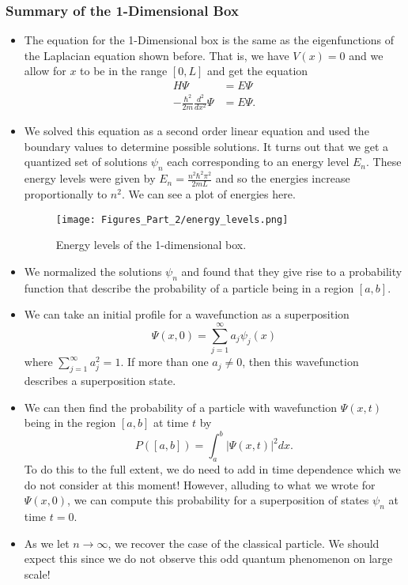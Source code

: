 \subsubsection{Summary of the 1-Dimensional Box}
\begin{itemize}
    \item The equation for the 1-Dimensional box is the same as the eigenfunctions of the Laplacian equation shown before. That is, we have $V(x)=0$ and we allow for $x$ to be in the range $[0,L]$ and get the equation
    \begin{align*}
        H\Psi &= E \Psi\\
        -\frac{\hbar^2}{2m}\frac{d^2}{dx^2}\Psi &= E \Psi.
    \end{align*}
    \item We solved this equation as a second order linear equation and used the boundary values to determine possible solutions.  It turns out that we get a quantized set of solutions $\psi_n$ each corresponding to an energy level $E_n$. These energy levels were given by $E_n = \frac{n^2 \hbar^2 \pi^2}{2mL}$ and so the energies increase proportionally to $n^2$. We can see a plot of energies here.
    \begin{figure}[H]
        \centering
        \texttt{[image: Figures\_Part\_2/energy\_levels.png]}
        \caption{Energy levels of the 1-dimensional box.}
    \end{figure}
    \item We normalized the solutions $\psi_n$ and found that they give rise to a probability function that describe the probability of a particle being in a region $[a,b]$.
    \item We can take an initial profile for a wavefunction as a superposition
    \[
    \Psi(x,0)=\sum_{j=1}^\infty a_j \psi_j(x)
    \]
    where $\sum_{j=1}^\infty a_j^2 = 1$. If more than one $a_j\neq 0$, then this wavefunction describes a superposition state.
    \item We can then find the probability of a particle with wavefunction $\Psi(x,t)$ being in the region $[a,b]$ at time $t$ by
    \[
    P([a,b])=\int_a^b |\Psi(x,t)|^2dx.
    \]
    To do this to the full extent, we do need to add in time dependence which we do not consider at this moment! However, alluding to what we wrote for $\Psi(x,0)$, we can compute this probability for a superposition of states $\psi_n$ at time $t=0$.
    \item As we let $n\to \infty$, we recover the case of the classical particle.  We should expect this since we do not observe this odd quantum phenomenon on large scale!
\end{itemize}

